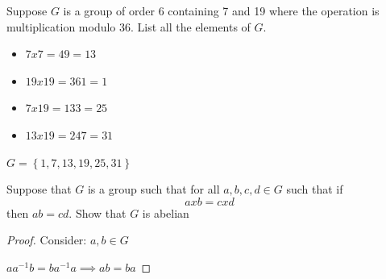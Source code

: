\begin{example}
    Suppose $G$ is a group of order 6 containing
    7 and 19 where the operation is multiplication 
    modulo 36. List all the elements of $G$.

    \begin{itemize}
        \item $7x7=49=13$
        \item $19x19=361=1$
        \item $7x19=133=25$
        \item $13x19=247=31$
    \end{itemize}
    $G=\left\{ 1,7,13,19,25,31 \right\}$
\end{example}

\begin{example}
    Suppose that $G$ is a group such that for all $a,b,c,d \in G$
    such that if \[axb=cxd\] then $ab=cd$. Show that $G$ is abelian

    \begin{proof}
        Consider: $a,b\in G$

        \(aa^{-1}b=ba^{-1}a\implies ab=ba\)
    \end{proof}
\end{example}
